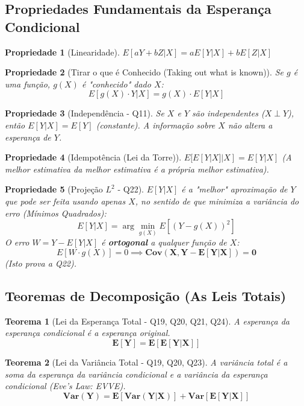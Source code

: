\documentclass[12pt, a4paper]{article}
\newtheorem{teo}{Teorema}
\newtheorem{prop}{Propriedade}
\begin{document}
\subsection{Propriedades Fundamentais da Esperança Condicional}

\begin{prop}[Linearidade]
$E[aY + bZ | X] = aE[Y|X] + bE[Z|X]$
\end{prop}

\begin{prop}[Tirar o que é Conhecido (Taking out what is known)]
Se $g$ é uma função, $g(X)$ é "conhecido" dado $X$:
$$ E[g(X) \cdot Y | X] = g(X) \cdot E[Y|X] $$
\end{prop}

\begin{prop}[Independência - Q11]
Se $X$ e $Y$ são independentes ($X \perp Y$), então $E[Y|X] = E[Y]$ (constante). A informação sobre $X$ não altera a esperança de $Y$.
\end{prop}

\begin{prop}[Idempotência (Lei da Torre)]
$E[ E[Y|X] | X ] = E[Y|X]$ (A melhor estimativa da melhor estimativa é a própria melhor estimativa).
\end{prop}

\begin{prop}[Projeção $L^2$ - Q22]
$E[Y|X]$ é a "melhor" aproximação de $Y$ que pode ser feita usando apenas $X$, no sentido de que minimiza a variância do erro (Mínimos Quadrados):
$$ E[Y|X] = \arg \min_{g(X)} E[(Y - g(X))^2] $$
O erro $W = Y - E[Y|X]$ é \textbf{ortogonal} a qualquer função de $X$:
$$ E[W \cdot g(X)] = 0 \implies \mathbf{Cov(X, Y - E[Y|X]) = 0} $$
(Isto prova a Q22).
\end{prop}

\subsection{Teoremas de Decomposição (As Leis Totais)}

\begin{teo}[Lei da Esperança Total - Q19, Q20, Q21, Q24]
A esperança da esperança condicional é a esperança original.
$$ \mathbf{E[Y] = E[E[Y|X]]} $$
\end{teo}

\begin{teo}[Lei da Variância Total - Q19, Q20, Q23]
A variância total é a soma da esperança da variância condicional e a variância da esperança condicional (Eve's Law: EVVE).
$$ \mathbf{Var(Y) = E[Var(Y|X)] + Var[E[Y|X]]} $$
\end{teo}
\end{document}
